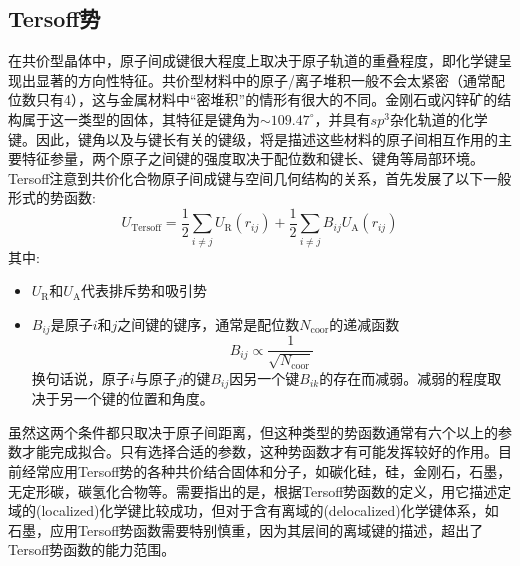 \subsection{\rm{Tersoff}势}
在共价型晶体中，原子间成键很大程度上取决于原子轨道的重叠程度，即化学键呈现出显著的方向性特征。共价型材料中的原子/离子堆积一般不会太紧密（通常配位数只有4），这与金属材料中“密堆积”的情形有很大的不同。金刚石或闪锌矿的结构属于这一类型的固体，其特征是键角为$\sim109.47^{\circ}$，并具有$sp^3$杂化轨道的化学键。因此，键角以及与键长有关的键级，将是描述这些材料的原子间相互作用的主要特征参量，两个原子之间键的强度取决于配位数和键长、键角等局部环境。\textrm{Tersoff}\cite{PRB37-6991_1988}注意到共价化合物原子间成键与空间几何结构的关系，首先发展了以下一般形式的势函数:~
\begin{equation}
	U_{\mathrm{Tersoff}}=\dfrac12\sum_{i\neq j}U_{\mathrm R}(r_{ij})+\dfrac12\sum_{i\neq j}B_{ij}U_{\mathrm A}(r_{ij})
	\label{eq:Potential_Tersoff}
\end{equation}
其中:
\begin{itemize}
	\item $U_{\mathrm R}$和$U_{\mathrm A}$代表排斥势和吸引势
	\item $B_{ij}$是原子$i$和$j$之间键的键序，通常是配位数$N_{\mathrm{coor}}$的递减函数
		\begin{displaymath}
			B_{ij}\propto\dfrac1{\sqrt{N_{\mathrm{coor}}}}
		\end{displaymath}
换句话说，原子$i$与原子$j$的键$B_{ij}$因另一个键$B_{ik}$的存在而减弱。减弱的程度取决于另一个键的位置和角度。
\end{itemize}
虽然这两个条件都只取决于原子间距离，但这种类型的势函数通常有六个以上的参数才能完成拟合。只有选择合适的参数，这种势函数才有可能发挥较好的作用。目前经常应用\textrm{Tersoff}势的各种共价结合固体和分子，如碳化硅，硅，金刚石，石墨，无定形碳，碳氢化合物等。需要指出的是，根据\textrm{Tersoff}势函数的定义，用它描述定域的\textrm{(localized)}化学键比较成功，但对于含有离域的\textrm{(delocalized)}化学键体系，如石墨，应用\textrm{Tersoff}势函数需要特别慎重，因为其层间的离域键的描述，超出了\textrm{Tersoff}势函数的能力范围。

